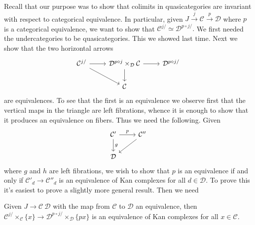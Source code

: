 \documentclass{amsart}
\begin{document}
Recall that our purpose was to show that colimits in quasicategories are invariant
with respect to categorical equivalence. In particular, given $J\xrightarrow{j}\mathcal{C}\xrightarrow{p}\mathcal{D}$
where $p$ is a categorical equivalence, we want to show that $\mathcal{C}^{j/}\simeq \mathcal{D}^{p\circ j/}.$
We first needed the undercategories to be quasicategories. This we showed last time.
Next we show that the two horizontal arrows
\begin{equation*}
    \begin{tikzcd}
        \mathcal{C}^{j/} \rar\ar[dr] & \mathcal{D}^{p\circ j}\times_\mathcal{D}\mathcal{C} \rar\dar & \mathcal{D}^{p\circ j/}\\
        & \mathcal{C}
    \end{tikzcd}
\end{equation*}
are equivalences. To see that the first is an equivalence we observe first
that the vertical maps in the triangle are left fibrations, whence it is
enough to show that it produces an equivalence on fibers. Thus we need
the following. Given
\begin{equation*}
    \begin{tikzcd}
        \mathcal{C'}\dar{g}\rar{p} & \mathcal{C}''\ar[dl]{h}\\
        \mathcal{D}
    \end{tikzcd}
\end{equation*}
where $g$ and $h$ are left fibrations, we wish to show that $p$ is an equivalence
if and only if $\mathcal{C}'_d\to \mathcal{C}''_d$ is an equivalence of Kan
complexes for all $d\in\mathcal{D}$. To prove this it's easiest to prove a slightly
more general result. Then we need
\begin{lemma}[HTT 2.5.4.1]
    Given $J\to \mathcal{C}\ \mathcal{D}$ with the map from $\mathcal{C}$ to $\mathcal{D}$
    an equivalence, then $\mathcal{C}^{j/}\times_\mathcal{C}\{x\}\to\mathcal{D}^{p\circ j/}\times_\mathcal{D}\{px\}$
    is an equivalence of Kan complexes for all $x\in \mathcal{C}$.
\end{lemma}
\end{document}

